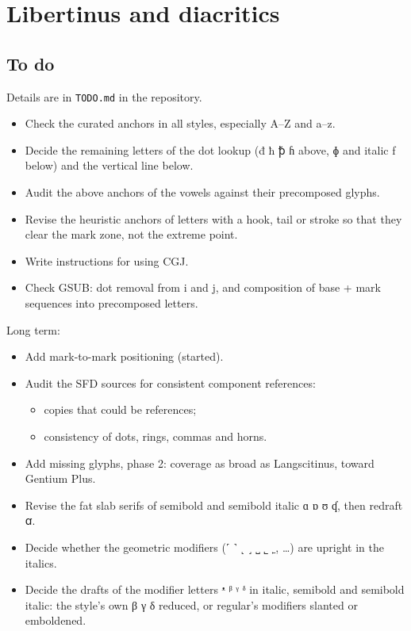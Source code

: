 \documentclass[landscape]{article}
\begin{document}
\section*{Libertinus and diacritics}

\subsection*{To do}

Details are in \verb|TODO.md| in the repository.
\begin{itemize}
	\item Check the curated anchors in all styles, especially A--Z and a--z.
	\item Decide the remaining letters of the dot lookup ({\LibertinusSerifPatch đ ħ ꝥ ɦ} above, {\LibertinusSerifPatch ɸ} and italic f below) and the vertical line below.
	\item Audit the above anchors of the vowels against their precomposed glyphs.
	\item Revise the heuristic anchors of letters with a hook, tail or stroke so that they clear the mark zone, not the extreme point.
	\item Write instructions for using CGJ.
	\item Check GSUB: dot removal from i and j, and composition of base + mark sequences into precomposed letters.
\end{itemize}
Long term:
\begin{itemize}
	\item Add mark-to-mark positioning (started).
	\item Audit the SFD sources for consistent component references:
	\begin{itemize}
		\item copies that could be references;
		\item consistency of dots, rings, commas and horns.
	\end{itemize}
	\item Add missing glyphs, phase 2: coverage as broad as Langscitinus, toward Gentium Plus.
	\item Revise the fat slab serifs of semibold and semibold italic ɑ ɒ ʊ ʠ, then redraft {\LibertinusSerifPatch ꭤ}.
	\item Decide whether the geometric modifiers (˹ ˺ ˻ ˼ ˽ ˾ ˿, …) are upright in the italics.
	\item Decide the drafts of the modifier letters ᵜ ᵝ ᵞ ᵟ in italic, semibold and semibold italic: the style's own β γ δ reduced, or regular's modifiers slanted or emboldened.
\end{itemize}
\end{document}
